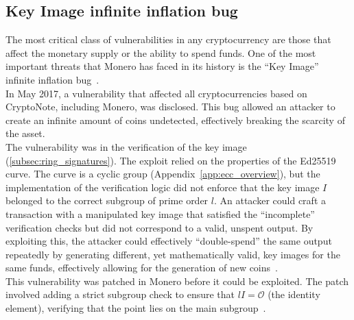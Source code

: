 \documentclass[conference]{IEEEtran}
\begin{document}
\subsection{Key Image infinite inflation bug}
The most critical class of vulnerabilities in any cryptocurrency are those that affect the monetary supply or the ability to spend funds. One of the most important threats that Monero has faced in its history is the ``Key Image'' infinite inflation bug~\cite{key_image_bug}.\\
In May 2017, a vulnerability that affected all cryptocurrencies based on CryptoNote, including Monero, was disclosed. This bug allowed an attacker to create an infinite amount of coins undetected, effectively breaking the scarcity of the asset.\\
The vulnerability was in the verification of the key image (\autoref{subsec:ring_signatures}). The exploit relied on the properties of the Ed25519 curve. The curve is a cyclic group (Appendix~\ref{app:ecc_overview}), but the implementation of the verification logic did not enforce that the key image $I$ belonged to the correct subgroup of prime order $l$. An attacker could craft a transaction with a manipulated key image that satisfied the ``incomplete'' verification checks but did not correspond to a valid, unspent output. By exploiting this, the attacker could effectively ``double-spend'' the same output repeatedly by generating different, yet mathematically valid, key images for the same funds, effectively allowing for the generation of new coins~\cite{key_image_bug}.\\
This vulnerability was patched in Monero before it could be exploited. The patch involved adding a strict subgroup check to ensure that $lI = \mathcal{O}$ (the identity element), verifying that the point lies on the main subgroup~\cite{key_image_bug}.
\end{document}
